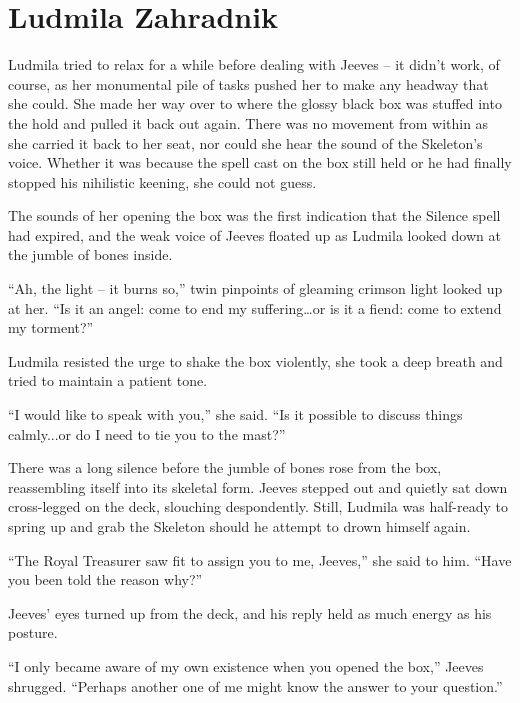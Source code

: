 \chapter{Ludmila Zahradnik}

Ludmila tried to relax for a while before dealing with Jeeves – it didn’t work, of course, as her monumental pile of tasks pushed her to make any headway that she could. She made her way over to where the glossy black box was stuffed into the hold and pulled it back out again. There was no movement from within as she carried it back to her seat, nor could she hear the sound of the Skeleton’s voice. Whether it was because the spell cast on the box still held or he had finally stopped his nihilistic keening, she could not guess.

 

The sounds of her opening the box was the first indication that the Silence spell had expired, and the weak voice of Jeeves floated up as Ludmila looked down at the jumble of bones inside.

 

“Ah, the light – it burns so,” twin pinpoints of gleaming crimson light looked up at her. “Is it an angel: come to end my suffering…or is it a fiend: come to extend my torment?”

 

Ludmila resisted the urge to shake the box violently, she took a deep breath and tried to maintain a patient tone.

 

“I would like to speak with you,” she said. “Is it possible to discuss things calmly...or do I need to tie you to the mast?”

 

There was a long silence before the jumble of bones rose from the box, reassembling itself into its skeletal form. Jeeves stepped out and quietly sat down cross-legged on the deck, slouching despondently. Still, Ludmila was half-ready to spring up and grab the Skeleton should he attempt to drown himself again.

 

“The Royal Treasurer saw fit to assign you to me, Jeeves,” she said to him. “Have you been told the reason why?”

 

Jeeves’ eyes turned up from the deck, and his reply held as much energy as his posture.

 

“I only became aware of my own existence when you opened the box,” Jeeves shrugged. “Perhaps another one of me might know the answer to your question.”

